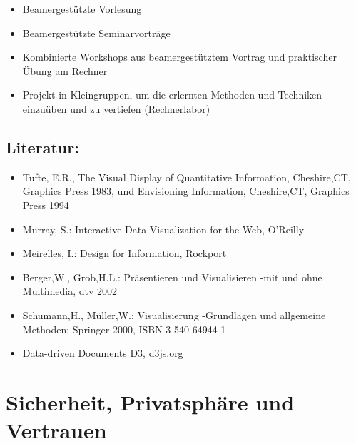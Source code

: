 \begin{itemize}
\tightlist
\item
  Beamergestützte Vorlesung
\item
  Beamergestützte Seminarvorträge
\item
  Kombinierte Workshops aus beamergestütztem Vortrag und praktischer
  Übung am Rechner
\item
  Projekt in Kleingruppen, um die erlernten Methoden und Techniken
  einzuüben und zu vertiefen (Rechnerlabor)
\end{itemize}

\section*{Literatur:\label{/mi-2017/modulbeschreibungen-master/MA_VC_Modul_Visualisierung}}\label{literaturpathlabelmi-2017modulbeschreibungen-mastermaux5fvcux5fmodulux5fvisualisierung}

\begin{itemize}
\tightlist
\item
  Tufte, E.R., The Visual Display of Quantitative Information,
  Cheshire,CT, Graphics Press 1983, und Envisioning Information,
  Cheshire,CT, Graphics Press 1994
\item
  Murray, S.: Interactive Data Visualization for the Web, O'Reilly
\item
  Meirelles, I.: Design for Information, Rockport
\item
  Berger,W., Grob,H.L.: Präsentieren und Visualisieren -mit und ohne
  Multimedia, dtv 2002
\item
  Schumann,H., Müller,W.; Visualisierung -Grundlagen und allgemeine
  Methoden; Springer 2000, ISBN 3-540-64944-1
\item
  Data-driven Documents D3, d3js.org
\end{itemize}

\chapter{Sicherheit, Privatsphäre und
Vertrauen\label{/mi-2017/modulbeschreibungen-master/MA_WTW_Modul_IT-Sicherheit}}\label{sicherheit-privatsphuxe4re-und-vertrauenpathlabelmi-2017modulbeschreibungen-mastermaux5fwtwux5fmodulux5fit-sicherheit}

